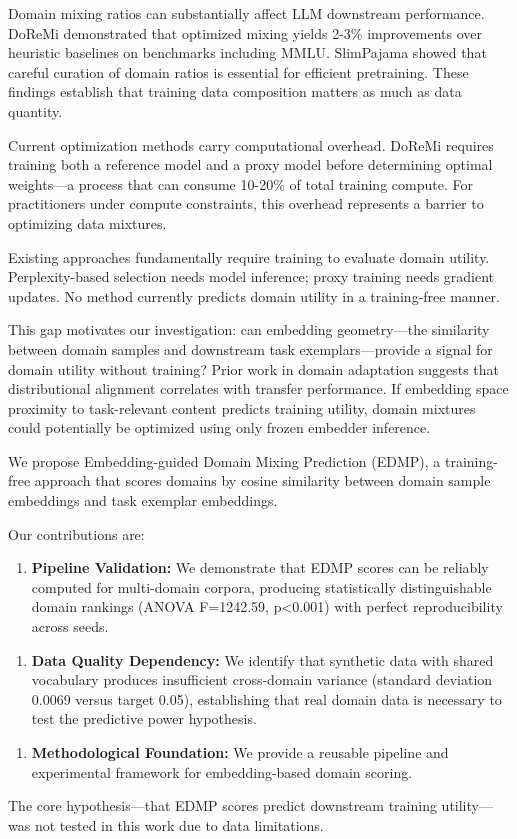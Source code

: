 
Domain mixing ratios can substantially affect LLM downstream performance. DoReMi demonstrated that optimized mixing yields 2-3\% improvements over heuristic baselines on benchmarks including MMLU. SlimPajama showed that careful curation of domain ratios is essential for efficient pretraining. These findings establish that training data composition matters as much as data quantity.

Current optimization methods carry computational overhead. DoReMi requires training both a reference model and a proxy model before determining optimal weights---a process that can consume 10-20\% of total training compute. For practitioners under compute constraints, this overhead represents a barrier to optimizing data mixtures.

Existing approaches fundamentally require training to evaluate domain utility. Perplexity-based selection needs model inference; proxy training needs gradient updates. No method currently predicts domain utility in a training-free manner.

This gap motivates our investigation: can embedding geometry---the similarity between domain samples and downstream task exemplars---provide a signal for domain utility without training? Prior work in domain adaptation suggests that distributional alignment correlates with transfer performance. If embedding space proximity to task-relevant content predicts training utility, domain mixtures could potentially be optimized using only frozen embedder inference.

We propose Embedding-guided Domain Mixing Prediction (EDMP), a training-free approach that scores domains by cosine similarity between domain sample embeddings and task exemplar embeddings.

Our contributions are:

\begin{enumerate}
\item \textbf{Pipeline Validation:} We demonstrate that EDMP scores can be reliably computed for multi-domain corpora, producing statistically distinguishable domain rankings (ANOVA F=1242.59, p<0.001) with perfect reproducibility across seeds.
\end{enumerate}

\begin{enumerate}
\item \textbf{Data Quality Dependency:} We identify that synthetic data with shared vocabulary produces insufficient cross-domain variance (standard deviation 0.0069 versus target 0.05), establishing that real domain data is necessary to test the predictive power hypothesis.
\end{enumerate}

\begin{enumerate}
\item \textbf{Methodological Foundation:} We provide a reusable pipeline and experimental framework for embedding-based domain scoring.
\end{enumerate}

The core hypothesis---that EDMP scores predict downstream training utility---was not tested in this work due to data limitations.

